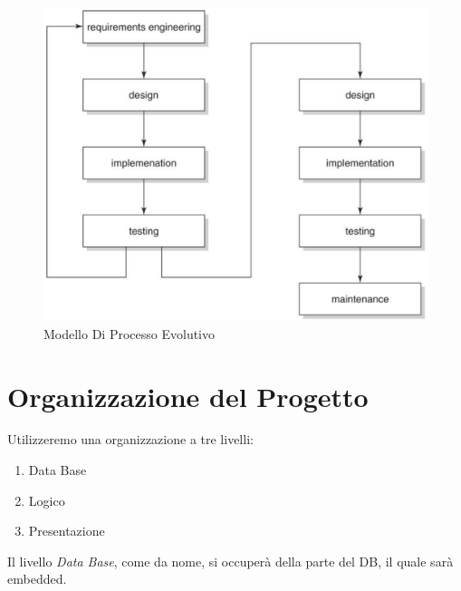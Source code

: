 \documentclass{book}
\begin{document}
\begin{figure}[h]
    \centering
    \includegraphics[width = 0.7\linewidth]{../../Immagini/Modello_Processo_Evolutivo.jpg}
    \caption{Modello Di Processo Evolutivo}
    \label{fig: modello_processo_evolutivo}
    
\end{figure}

\begin{tabbing}
    
\end{tabbing}
\begin{tabbing}
    
\end{tabbing}

\begin{tabbing}
    
\end{tabbing}

\begin{tabbing}
    
\end{tabbing}
\begin{tabbing}
    
\end{tabbing}
\section{Organizzazione del Progetto}\label{sez: organizzazioneProgetto}

Utilizzeremo una organizzazione a tre livelli:

\begin{enumerate}
    \item Data Base
    \item Logico
    \item Presentazione
\end{enumerate}
Il livello \textit{Data Base}, come da nome, si occuperà della parte del DB, il quale sarà embedded.
\end{document}
